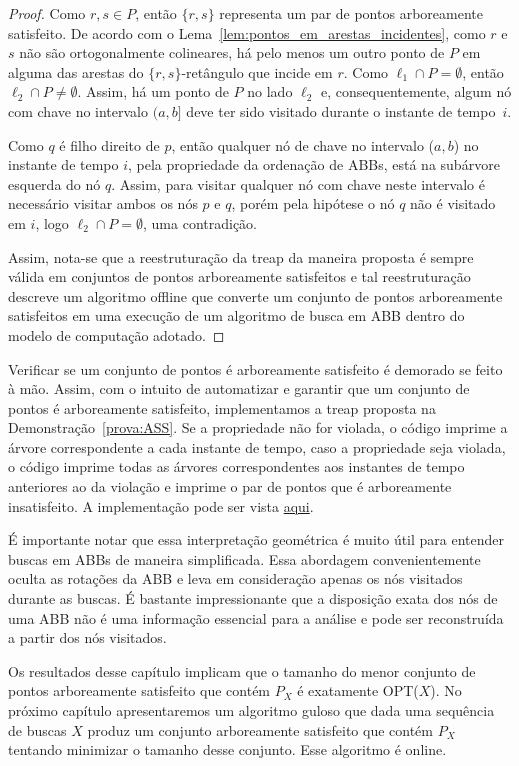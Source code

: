 \begin{proof}
Como $r,s \in P$, então $\{r,s\}$ representa um par de pontos arboreamente satisfeito. De acordo com o Lema~\ref{lem:pontos_em_arestas_incidentes}, como $r$ e $s$ não são ortogonalmente colineares, há pelo menos um outro ponto de $P$ em alguma das arestas do $\{r,s\}$-retângulo que incide em $r$. Como $\ell_1 \cap P = \emptyset$, então $\ell_2 \cap P \neq \emptyset$. Assim, há um ponto de $P$ no lado $\ell_2$ e, consequentemente, algum nó com chave no intervalo $(a,b]$ deve ter sido visitado durante o instante de tempo~$i$.

Como $q$ é filho direito de $p$, então qualquer nó de chave no intervalo ($a,b$) no instante de tempo $i$, pela propriedade da ordenação de ABBs, está na subárvore esquerda do nó $q$. Assim, para visitar qualquer nó com chave neste intervalo é necessário visitar ambos os nós $p$ e $q$, porém pela hipótese o nó $q$ não é visitado em $i$, logo $\ell_2 \cap P = \emptyset$, uma contradição.

Assim, nota-se que a reestruturação da treap da maneira proposta é sempre válida em conjuntos de pontos arboreamente satisfeitos e tal reestruturação descreve um algoritmo offline que converte um conjunto de pontos arboreamente satisfeitos em uma execução de um algoritmo de busca em ABB dentro do modelo de computação adotado.
\end{proof}

Verificar se um conjunto de pontos é arboreamente satisfeito é demorado se feito à mão. Assim, com o intuito de automatizar e garantir que um conjunto de pontos é arboreamente satisfeito, implementamos a treap proposta na Demonstração~\ref{prova:ASS}. %
Se a propriedade não for violada, o código imprime a árvore correspondente a cada instante de tempo, caso a propriedade seja violada, o código imprime todas as árvores correspondentes aos instantes de tempo anteriores ao da violação e imprime o par de pontos que é arboreamente insatisfeito. A implementação pode ser vista \href{https://github.com/BrunoArmondBraga/TCC/blob/main/src/ValidAss.cpp}{aqui}.

É importante notar que essa interpretação geométrica é muito útil para entender buscas em ABBs de maneira simplificada. Essa abordagem convenientemente oculta as rotações da ABB e leva em consideração apenas os nós visitados durante as buscas. É bastante impressionante que a disposição exata dos nós de uma ABB não é uma informação essencial para a análise e pode ser reconstruída a partir dos nós visitados.

Os resultados desse capítulo implicam que o tamanho do menor conjunto de pontos arboreamente satisfeito que contém $P_X$ é exatamente OPT($X$). No próximo capítulo apresentaremos um algoritmo guloso que dada uma sequência de buscas $X$ produz um conjunto arboreamente satisfeito que contém $P_X$ tentando minimizar o tamanho desse conjunto. Esse algoritmo é online.